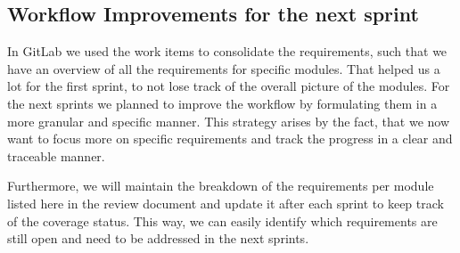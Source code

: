 \documentclass[12pt,a4paper]{article}
\begin{document}
\subsection{Workflow Improvements for the next sprint}
In GitLab we used the work items to consolidate the requirements, such that we have an overview of all the requirements for specific modules. That helped us a lot for the first sprint, to not lose track of the overall picture of the modules. For the next sprints we planned to improve the workflow by formulating them in a more granular and specific manner. This strategy arises by the fact, that we now want to focus more on specific requirements and track the progress in a clear and traceable manner.

Furthermore, we will maintain the breakdown of the requirements per module listed here in the review document and update it after each sprint to keep track of the coverage status. This way, we can easily identify which requirements are still open and need to be addressed in the next sprints.
\end{document}
